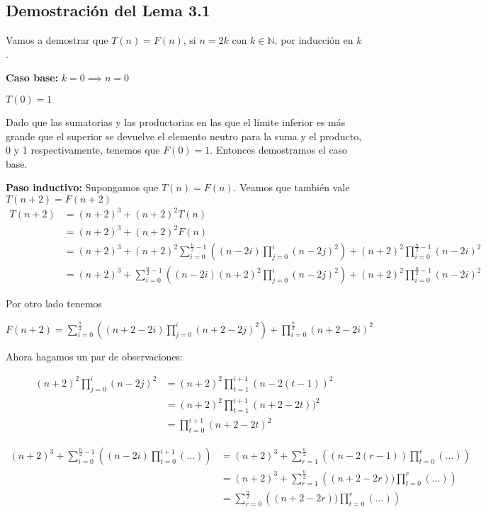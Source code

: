 \subsection{Demostración del Lema 3.1}

Vamos a demostrar que $T(n) = F(n)$, si $n=2k$ con $k\in\mathbb{N}$, por inducción en $k$.

\textbf{Caso base:} $k=0 \implies n=0$

  $T(0) = 1$ 

  Dado que las sumatorias y las productorias en las que el límite inferior es más grande que el superior se devuelve el elemento neutro para la suma y el producto, 0 y 1 respectivamente, tenemos que $F(0) = 1$. Entonces demostramos el caso base.

\textbf{Paso inductivo:} Supongamos que $T(n) = F(n)$. Veamos que también vale $T(n + 2) = F(n + 2)$ \\
  \begin{equation}
  \label{eq:ind3-1}
  \begin{aligned}
  T(n+2) &= (n+2)^3 + (n+2)^2 T(n) \\
         &= (n+2)^3 + (n+2)^2 F(n) \\
         &= (n+2)^3 + (n+2)^2 \sum_{i=0}^{\frac{n}{2}-1} \left((n-2i) \prod_{j=0}^{i}(n-2j)^2\right) + (n+2)^2 \prod_{i=0}^{\frac{n}{2}-1}(n-2i)^2\\
         &= (n+2)^3 + \sum_{i=0}^{\frac{n}{2}-1} \left((n-2i) (n+2)^2 \prod_{j=0}^{i}(n-2j)^2\right) + (n+2)^2 \prod_{i=0}^{\frac{n}{2}-1}(n-2i)^2
  \end{aligned}
  \end{equation}

  Por otro lado tenemos

  $F(n+2) = \sum_{i=0}^{\frac{n}{2}} \left((n+2-2i) \prod_{j=0}^{i}(n+2-2j)^2\right) + \prod_{i=0}^{\frac{n}{2}}(n+2-2i)^2$

  Ahora hagamos un par de observaciones:

  \begin{equation}
  \label{eq:ind3-2}
  \begin{aligned}
  (n+2)^2 \prod_{j=0}^{i}(n-2j)^2
  &= (n+2)^2 \prod_{t=1}^{i+1}(n-2(t-1))^2\\
  &= (n+2)^2 \prod_{t=1}^{i+1}(n+2-2t))^2\\
  &= \prod_{t=0}^{i+1}(n+2-2t)^2 
  \end{aligned}
  \end{equation}

  \begin{equation}
  \label{eq:ind3-3}
  \begin{aligned}
  (n+2)^3 + \sum_{i=0}^{\frac{n}{2}-1} \left((n-2i) \prod_{t=0}^{i+1}(\hdots)\right)
  &= (n+2)^3 + \sum_{r=1}^{\frac{n}{2}} \left((n-2(r-1)) \prod_{t=0}^{r}(\hdots)\right) \\
  &= (n+2)^3 + \sum_{r=1}^{\frac{n}{2}} \left((n+2-2r)) \prod_{t=0}^{r}(\hdots)\right) \\
  &= \sum_{r=0}^{\frac{n}{2}} \left((n+2-2r)) \prod_{t=0}^{r}(\hdots)\right)
  \end{aligned}
  \end{equation}

